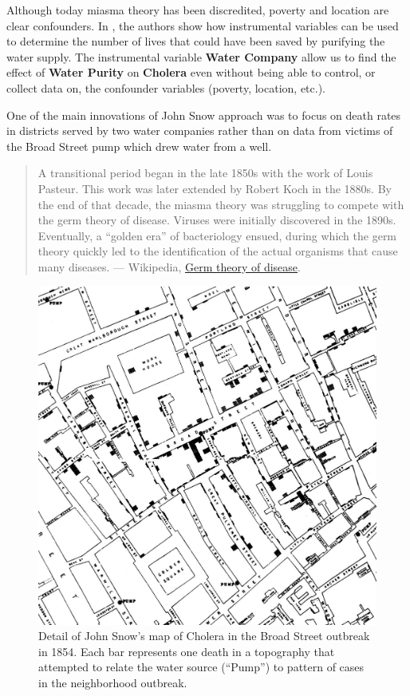 \documentclass[
]{book}
\begin{document}
Although today miasma theory has been discredited, poverty and location are clear confounders. In \citep{book-of-why}, the authors show how instrumental variables can be used to determine the number of lives that could have been saved by purifying the water supply. The instrumental variable \textbf{Water Company} allow us to find the effect of \textbf{Water Purity} on \textbf{Cholera} even without being able to control, or collect data on, the confounder variables (poverty, location, etc.).

One of the main innovations of John Snow approach was to focus on death rates in districts served by two water companies rather than on data from victims of the Broad Street pump which drew water from a well.

\begin{quote}
A transitional period began in the late 1850s with the work of Louis Pasteur. This work was later extended by Robert Koch in the 1880s. By the end of that decade, the miasma theory was struggling to compete with the germ theory of disease. Viruses were initially discovered in the 1890s. Eventually, a ``golden era'' of bacteriology ensued, during which the germ theory quickly led to the identification of the actual organisms that cause many diseases. --- Wikipedia, \href{https://en.wikipedia.org/wiki/Germ_theory_of_disease}{Germ theory of disease}.
\end{quote}

\begin{figure}[htbp]

{\centering \includegraphics[width=1\linewidth]{Figures/snow-cholera-map-crop} 

}

\caption{Detail of John Snow’s map of Cholera in the Broad Street outbreak in 1854. Each bar represents one death in a topography that attempted to relate the water source (“Pump”) to pattern of cases in the neighborhood outbreak.}\label{fig:snow-map}
\end{figure}
\end{document}
